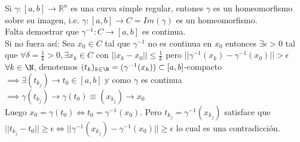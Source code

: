  \begin{observación}
    Si $\gamma: [a,b] \to \mathbb{R}^n$ es una curva simple regular, entones $\gamma$ es un homeomorfismo sobre su imagen, i.e. $\gamma: [a, b] \to C = Im(\gamma)$ es un homeomorfismo. \\
    Falta demostrar que $\gamma^{-1}: C \to [a,b]$ es continua.\\
    Si no fuera así: Sea $x_0 \in C$ tal que $\gamma^{-1}$ no es continua en $x_0$ entonces $\exists \epsilon > 0$ tal que $\forall \delta = \frac{1}{k} > 0, \exists x_k \in C$ con $ ||x_k - x_0|| \leq \frac{1}{k}$ pero $||\gamma^{-1}(x_k) - \gamma^{-1}(x_0)|| > \epsilon$ \\
    $\forall k \in \N$, denotemos $(t_k)_{k \in \N} = (\gamma^{-1}(x_k)) \subset [a,b]$-compacto $\implies \exists (t_{k_j}) \to t_0 \in [a,b]$ y como $\gamma$ es continua $\implies \gamma(t_{k_j}) \to \gamma(t_0) \equiv (x_{k_j}) \to x_0$ \\
    Luego $x_0 = \gamma(t_0) \iff t_0 = \gamma^{-1}(x_0)$. Pero $t_{k_j} = \gamma^{-1}(x_{k_j})$ satisface que $||t_{k_j} - t_0|| \geq \epsilon \iff ||\gamma^{-1}(x_{k_j}) - \gamma^{-1}(x_0)|| \geq \epsilon$ lo cual es una contradicción.
 \end{observación}

